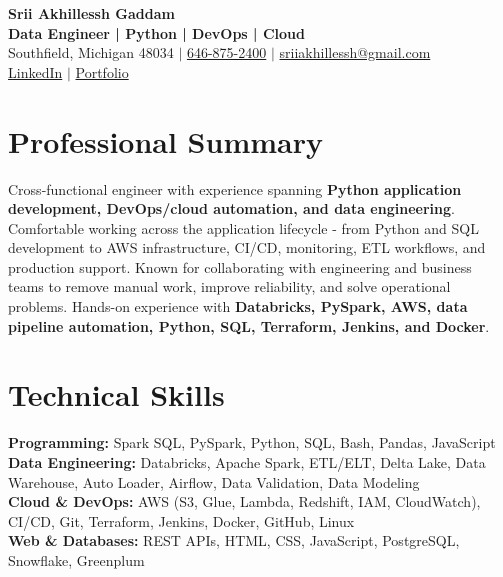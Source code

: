 \documentclass[letterpaper,10pt]{article}
\begin{document}
\fontsize{9.35pt}{10.45pt}\selectfont

\begin{center}
    {\LARGE \textbf{Srii Akhillessh Gaddam}} \\[-1pt]
    \textbf{Data Engineer | Python | DevOps | Cloud} \\[2pt]
    Southfield, Michigan 48034 $|$
    \href{tel:6468752400}{646-875-2400} $|$
    \href{mailto:sriiakhillessh@gmail.com}{sriiakhillessh@gmail.com} \\[1pt]
    \href{https://www.linkedin.com/in/srii-akhiilessh-gaddam-b48668191/}{LinkedIn} $|$
    \href{https://sriiakhillesshg.github.io/portfolio/}{Portfolio}
\end{center}
\vspace{-8pt}

\section{Professional Summary}
\small{Cross-functional engineer with experience spanning \textbf{Python application development, DevOps/cloud automation, and data engineering}. Comfortable working across the application lifecycle - from Python and SQL development to AWS infrastructure, CI/CD, monitoring, ETL workflows, and production support. Known for collaborating with engineering and business teams to remove manual work, improve reliability, and solve operational problems. Hands-on experience with \textbf{Databricks, PySpark, AWS, data pipeline automation, Python, SQL, Terraform, Jenkins, and Docker}.}

\section{Technical Skills}
\small{
\textbf{Programming:} Spark SQL, PySpark, Python, SQL, Bash, Pandas, JavaScript \\
\textbf{Data Engineering:} Databricks, Apache Spark, ETL/ELT, Delta Lake, Data Warehouse, Auto Loader, Airflow, Data Validation, Data Modeling \\
\textbf{Cloud \& DevOps:} AWS (S3, Glue, Lambda, Redshift, IAM, CloudWatch), CI/CD, Git, Terraform, Jenkins, Docker, GitHub, Linux \\
\textbf{Web \& Databases:} REST APIs, HTML, CSS, JavaScript, PostgreSQL, Snowflake, Greenplum
}
\end{document}
